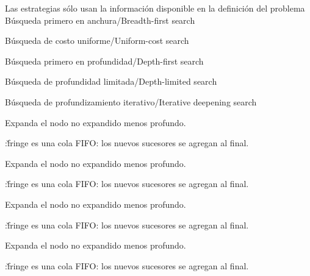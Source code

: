 \documentclass{article}
\begin{document}
\begin{huge}
Las estrategias  s{\'o}lo usan la
informaci{\'o}n
disponible en la definici{\'o}n del problema\\

B{\'u}squeda primero en anchura/Breadth-first search

B{\'u}squeda de costo uniforme/Uniform-cost search

B{\'u}squeda primero en profundidad/Depth-first search

B{\'u}squeda de profundidad limitada/Depth-limited search

B{\'u}squeda de profundizamiento iterativo/Iterative deepening
search



Expanda el nodo no expandido menos profundo.

:\nl \v{fringe} es una cola FIFO: los
nuevos sucesores se agregan al final.

\textwidth
{}


Expanda el nodo no expandido menos profundo.

:\nl \v{fringe} es una cola FIFO: los
nuevos sucesores se agregan al final.

\textwidth
{}


Expanda el nodo no expandido menos profundo.

:\nl \v{fringe} es una cola FIFO: los
nuevos sucesores se agregan al final.

\textwidth
{}


Expanda el nodo no expandido menos profundo.

:\nl \v{fringe} es una cola FIFO: los
nuevos sucesores se agregan al final.

\textwidth
{}



\end{huge}
\end{document}
